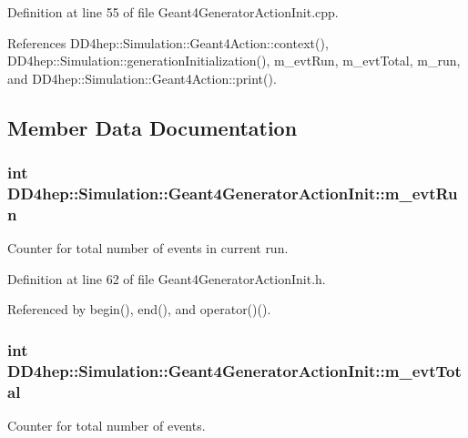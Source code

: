 Definition at line 55 of file Geant4GeneratorActionInit.cpp.

References DD4hep::Simulation::Geant4Action::context(), DD4hep::Simulation::generationInitialization(), m\_\-evtRun, m\_\-evtTotal, m\_\-run, and DD4hep::Simulation::Geant4Action::print().

\subsection{Member Data Documentation}
\hypertarget{class_d_d4hep_1_1_simulation_1_1_geant4_generator_action_init_a4d685bb901485377aa271474ed70969b}{
\subsubsection[{m\_\-evtRun}]{\setlength{\rightskip}{0pt plus 5cm}int {\bf DD4hep::Simulation::Geant4GeneratorActionInit::m\_\-evtRun}}}
\label{class_d_d4hep_1_1_simulation_1_1_geant4_generator_action_init_a4d685bb901485377aa271474ed70969b}


Counter for total number of events in current run. 

Definition at line 62 of file Geant4GeneratorActionInit.h.

Referenced by begin(), end(), and operator()().\hypertarget{class_d_d4hep_1_1_simulation_1_1_geant4_generator_action_init_a88579a131b4e22fa0b05f87fe1a8276c}{
\subsubsection[{m\_\-evtTotal}]{\setlength{\rightskip}{0pt plus 5cm}int {\bf DD4hep::Simulation::Geant4GeneratorActionInit::m\_\-evtTotal}}}
\label{class_d_d4hep_1_1_simulation_1_1_geant4_generator_action_init_a88579a131b4e22fa0b05f87fe1a8276c}


Counter for total number of events. 

